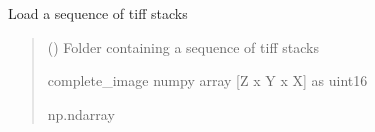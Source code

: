 \documentclass[letterpaper,10pt,english]{sphinxmanual}
\begin{document}
\begin{fulllineitems}
\label{\detokenize{CalSciPy.io:CalSciPy.io.load_all_tiffs}}
\pysigstartsignatures
{}
\pysigstopsignatures
\sphinxAtStartPar
Load a sequence of tiff stacks
\begin{quote}\begin{description}
\sphinxAtStartPar
{} (\sphinxstyleliteralemphasis{\sphinxupquote{{[}}}\sphinxstyleliteralemphasis{\sphinxupquote{, }}\sphinxstyleliteralemphasis{\sphinxupquote{{]}}}) \sphinxhyphen{}\sphinxhyphen{} Folder containing a sequence of tiff stacks

\sphinxAtStartPar
complete\_image numpy array {[}Z x Y x X{]} as uint16

\sphinxAtStartPar
np.ndarray

\end{description}\end{quote}

\end{fulllineitems}

\end{document}
